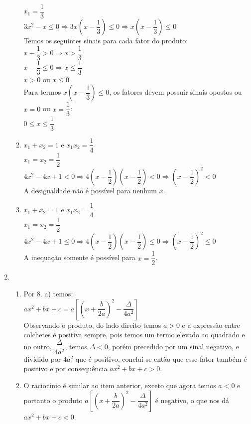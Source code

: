 \begin{enumerate}
\begin{enumerate}
			$x_{1}=\dfrac{1}{3}$\\[6pt]
			$3x^2-x \leq 0 \Rightarrow 3x(x-\dfrac{1}{3})\leq 0 \Rightarrow x(x-\dfrac{1}{3})\leq 0$\\[6pt]
			Temos os seguintes sinais para cada fator do produto:\\
			$x-\dfrac{1}{3} > 0 \Rightarrow x>\dfrac{1}{3}$\\[6pt]
			$x-\dfrac{1}{3} \leq 0 \Rightarrow x \leq \dfrac{1}{3}$\\[6pt]
			$x > 0$ ou $x \leq 0$\\
			Para termos $ x(x-\dfrac{1}{3})\leq 0$, os fatores devem possuir sinais opostos ou $x = 0$ ou $x = \dfrac{1}{3}$:\\[6pt]
			$0 \leq x \leq \dfrac{1}{3}$
			\item %
			$x_{1}+x_{2}=1$ e $x_{1}x_{2}=\dfrac{1}{4}$\\[6pt]
			$x_{1} = x_{2}= \dfrac{1}{2}$\\[6pt]
			$4x^2 - 4x + 1 < 0 \Rightarrow 4(x - \dfrac{1}{2})(x - \dfrac{1}{2}) < 0 \Rightarrow (x - \dfrac{1}{2})^2 < 0$\\[6pt]
			A desigualdade não é possível para nenhum $x$.
			\item %
			$x_{1}+x_{2}= 1$ e $x_{1}x_{2}=\dfrac{1}{4} $\\[6pt]
			$x_{1} = x_{2}= \dfrac{1}{2}$\\[6pt]
			$4x^2 - 4x + 1 \leq 0 \Rightarrow 4(x - \dfrac{1}{2})(x - \dfrac{1}{2}) \leq 0 \Rightarrow (x - \dfrac{1}{2})^2 \leq 0$\\[6pt]
			A inequação somente é possível para $x=\dfrac{1}{2}$.
		\end{enumerate}
	\item %
		\begin{enumerate}
			\item %
			Por 8. a) temos:\\
			$ax^2+bx+c = a\left[\left(x+\dfrac{b}{2a}\right)^2-\dfrac{\Delta}{4a^2}\right]$\\[6pt]
			Observando o produto, do lado direito temos $a > 0$ e a expressão entre colchetes é positiva sempre, pois temos um termo elevado ao quadrado e no outro, $\dfrac{\Delta}{4a^2}$, temos $\Delta < 0$, porém precedido por um sinal negativo, e dividido por $4a^2$ que é positivo, conclui-se então que esse fator também é positivo e por consequência $ax^2+bx+c > 0$.
			\item %
			O raciocínio é similar ao item anterior, exceto que agora temos $a < 0$ e portanto o produto $a\left[\left(x+\dfrac{b}{2a}\right)^2-\dfrac{\Delta}{4a^2}\right]$ é negativo, o que nos dá  $ax^2+bx+c < 0$.

\end{enumerate}
\end{enumerate}

